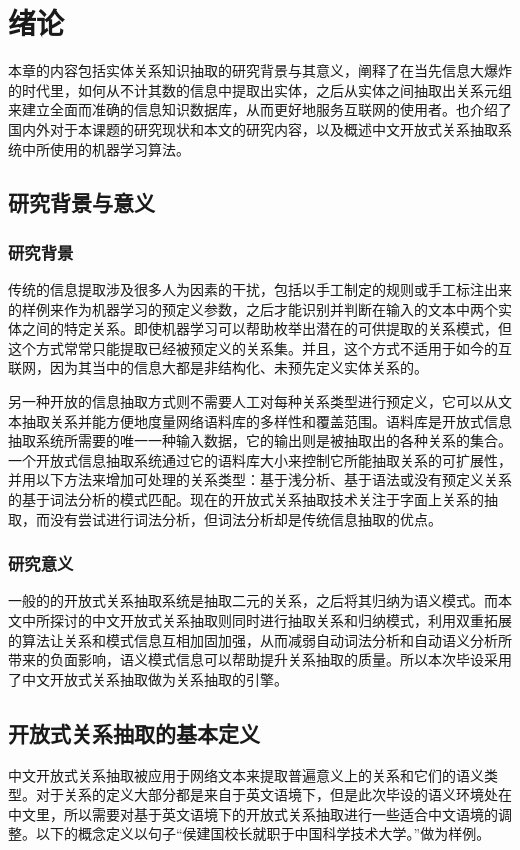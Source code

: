 \chapter{绪论}
\label{chap:introduction}

本章的内容包括实体关系知识抽取的研究背景与其意义，阐释了在当先信息大爆炸的时代里，如何从不计其数的信息中提取出实体，之后从实体之间抽取出关系元组来建立全面而准确的信息知识数据库，从而更好地服务互联网的使用者。也介绍了国内外对于本课题的研究现状和本文的研究内容，以及概述中文开放式关系抽取系统中所使用的机器学习算法。

\section{研究背景与意义}

\subsection{研究背景}

传统的信息提取涉及很多人为因素的干扰，包括以手工制定的规则或手工标注出来的样例来作为机器学习的预定义参数，之后才能识别并判断在输入的文本中两个实体之间的特定关系\citep{wang}。即使机器学习可以帮助枚举出潜在的可供提取的关系模式，但这个方式常常只能提取已经被预定义的关系集。并且，这个方式不适用于如今的互联网，因为其当中的信息大都是非结构化、未预先定义实体关系的。

另一种开放的信息抽取\citep{banko}方式则不需要人工对每种关系类型进行预定义，它可以从文本抽取关系并能方便地度量网络语料库的多样性和覆盖范围。语料库是开放式信息抽取系统所需要的唯一一种输入数据，它的输出则是被抽取出的各种关系的集合。一个开放式信息抽取系统通过它的语料库大小来控制它所能抽取关系的可扩展性，并用以下方法来增加可处理的关系类型：基于浅分析、基于语法或没有预定义关系的基于词法分析的模式匹配\citep{wu2010, naka2012, etz2011}。现在的开放式关系抽取技术关注于字面上关系的抽取，而没有尝试进行词法分析，但词法分析却是传统信息抽取的优点。

\subsection{研究意义}
一般的的开放式关系抽取系统是抽取二元的关系，之后将其归纳为语义模式。而本文中所探讨的中文开放式关系抽取则同时进行抽取关系和归纳模式，利用双重拓展的算法让关系和模式信息互相加固加强，从而减弱自动词法分析和自动语义分析所带来的负面影响，语义模式信息可以帮助提升关系抽取的质量。所以本次毕设采用了中文开放式关系抽取做为关系抽取的引擎。

\section{开放式关系抽取的基本定义}
中文开放式关系抽取被应用于网络文本来提取普遍意义上的关系和它们的语义类型。对于关系的定义大部分都是来自于英文语境下，但是此次毕设的语义环境处在中文里，所以需要对基于英文语境下的开放式关系抽取进行一些适合中文语境的调整。以下的概念定义以句子“侯建国校长就职于中国科学技术大学。”做为样例。

